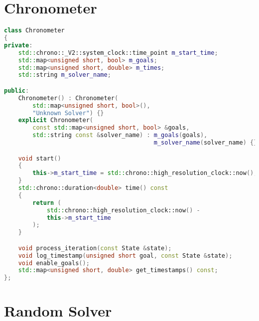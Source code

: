 
\section{Chronometer}

\begin{lstlisting}[language=C++, caption=Clase Chronometer utilizada para tomar mediciones, label=lst:Chronometer]
class Chronometer
{
private:
    std::chrono::_V2::system_clock::time_point m_start_time;
    std::map<unsigned short, bool> m_goals;
    std::map<unsigned short, double> m_times;
    std::string m_solver_name;

public:
    Chronometer() : Chronometer(
        std::map<unsigned short, bool>(),
        "Unknown Solver") {}
    explicit Chronometer(
        const std::map<unsigned short, bool> &goals,
        std::string const &solver_name) : m_goals(goals),
                                          m_solver_name(solver_name) {}

    void start()
    {
        this->m_start_time = std::chrono::high_resolution_clock::now();
    }
    std::chrono::duration<double> time() const
    {
        return (
            std::chrono::high_resolution_clock::now() -
            this->m_start_time
        );
    }

    void process_iteration(const State &state);
    void log_timestamp(unsigned short goal, const State &state);
    void enable_goals();
    std::map<unsigned short, double> get_timestamps() const;
};
\end{lstlisting}

\section{Random Solver}
\label{sec:RandomSolver}

